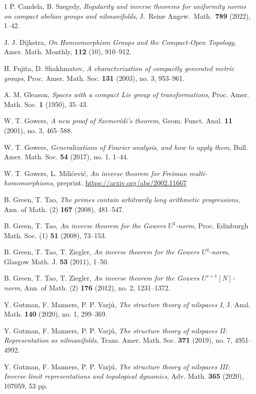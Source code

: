 \documentclass[a4paper,12pt,reqno]{amsart}
\theoremstyle{definition}
\begin{document}
\begin{thebibliography}{1}
 P. Candela, B. Szegedy, \emph{Regularity and inverse theorems for uniformity norms on compact abelian groups and nilmanifolds}, J.\ Reine Angew.\ Math.\ \textbf{789} (2022), 1--42. 

 J. J. Dijkstra, \emph{On Homeomorphism Groups and the
Compact-Open Topology}, Amer. Math. Monthly, \textbf{112} (10), 910--912.

 H. Fujita, D. Shakhmatov, \emph{A characterization of compactly generated metric groups}, Proc. Amer. Math. Soc. \textbf{131} (2003), no. 3, 953--961.

 A. M. Gleason, \emph{Spaces with a compact Lie group of transformations}, Proc. Amer. Math. Soc. \textbf{1} (1950), 35--43.

 W. T. Gowers, \emph{A new proof of Szemer\'edi's theorem},  Geom. Funct. Anal. \textbf{11} (2001), no. 3, 465--588.

 W. T. Gowers, \emph{Generalizations of Fourier analysis, and how to apply them}, Bull. Amer. Math. Soc. \textbf{54} (2017), no. 1, 1–44.

 W. T. Gowers, L. Mili\'cevi\'c, \emph{An inverse theorem for Freiman multi-homomorphisms}, preprint. \url{https://arxiv.org/abs/2002.11667}

 B. Green, T. Tao, \emph{The primes contain arbitrarily long
arithmetic progressions}, Ann. of Math. (2) \textbf{167} (2008), 481--547.

  B. Green, T. Tao, \emph{An inverse theorem for the Gowers $U^3$-norm}, Proc. Edinburgh Math. Soc. (1) \textbf{51} (2008), 73--153.

 B. Green, T. Tao, T. Ziegler, \emph{An inverse theorem for the Gowers $U^4$-norm}, Glasgow Math. J. \textbf{53} (2011), 1--50. 

 B. Green, T. Tao, T. Ziegler, \emph{An inverse theorem for the Gowers $U^{s+1}[N]$-norm}, Ann. of Math. (2) \textbf{176} (2012), no. 2, 1231--1372.

 Y. Gutman, F. Manners, P. P. Varj\'u, \emph{The structure theory of nilspaces I},  J. Anal. Math. \textbf{140} (2020), no. 1, 299--369.

 Y. Gutman, F. Manners, P. P. Varj\'u, \emph{The structure theory of nilspaces II: Representation as nilmanifolds},  Trans. Amer. Math. Soc. \textbf{371} (2019), no. 7, 4951--4992. 

 Y. Gutman, F. Manners, P. P. Varj\'u, \emph{The structure theory of nilspaces III: Inverse limit representations and topological dynamics}, Adv. Math. \textbf{365} (2020), 107059, 53 pp.


\end{thebibliography}
\end{document}
